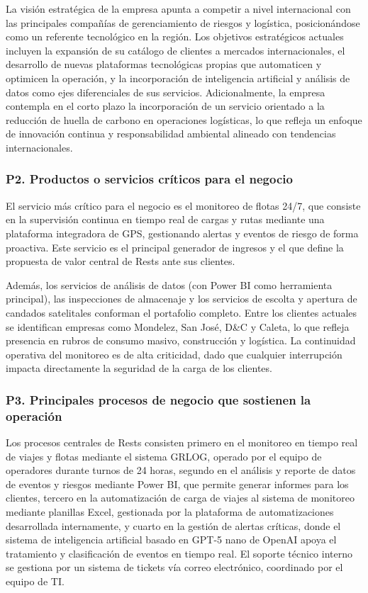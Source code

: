 \documentclass[12pt]{article}
\begin{document}
La visi\'on estrat\'egica de la empresa apunta a competir a nivel internacional con las principales
compa\~n\'ias de gerenciamiento de riesgos y log\'istica, posicion\'andose como un referente
tecnol\'ogico en la regi\'on. Los objetivos estrat\'egicos actuales incluyen la expansi\'on de su
catálogo de clientes a mercados internacionales, el desarrollo de nuevas plataformas tecnol\'ogicas
propias que automaticen y optimicen la operaci\'on, y la incorporaci\'on de inteligencia artificial
y an\'alisis de datos como ejes diferenciales de sus servicios. Adicionalmente, la empresa contempla
en el corto plazo la incorporaci\'on de un servicio orientado a la reducci\'on de huella de carbono
en operaciones log\'isticas, lo que refleja un enfoque de innovaci\'on continua y responsabilidad
ambiental alineado con tendencias internacionales.

\subsubsection*{\textbf{P2. Productos o servicios cr\'iticos para el negocio}}

El servicio m\'as cr\'itico para el negocio es el monitoreo de flotas 24/7, que consiste
en la supervisi\'on continua en tiempo real de cargas y rutas mediante una plataforma integradora
de GPS, gestionando alertas y eventos de riesgo de forma proactiva. Este servicio es el principal
generador de ingresos y el que define la propuesta de valor central de Rests ante sus clientes.

Además, los servicios de an\'alisis de datos (con Power BI como herramienta
principal), las inspecciones de almacenaje y los servicios de escolta y apertura
de candados satelitales conforman el portafolio completo. Entre los clientes actuales se
identifican empresas como Mondelez, San Jos\'e, D\&C y Caleta, lo que refleja presencia en
rubros de consumo masivo, construcci\'on y log\'istica. La continuidad operativa del monitoreo
es de alta criticidad, dado que cualquier interrupci\'on impacta directamente la seguridad de
la carga de los clientes.

\subsubsection*{\textbf{P3. Principales procesos de negocio que sostienen la operaci\'on}}

Los procesos centrales de Rests consisten primero en el monitoreo en tiempo real de viajes y flotas
mediante el sistema GRLOG, operado por el equipo de operadores durante turnos de 24 horas, segundo en el an\'alisis y reporte de datos de eventos y riesgos mediante Power BI, que permite
generar informes para los clientes, tercero en la automatizaci\'on de carga de viajes al sistema
de monitoreo mediante planillas Excel, gestionada por la plataforma de automatizaciones desarrollada
internamente, y cuarto en la gesti\'on de alertas cr\'iticas, donde el sistema de inteligencia
artificial basado en GPT-5 nano de OpenAI apoya el tratamiento y clasificaci\'on de eventos en tiempo
real. El soporte t\'ecnico interno se gestiona por un sistema de tickets v\'ia correo electr\'onico,
coordinado por el equipo de TI.
\end{document}
